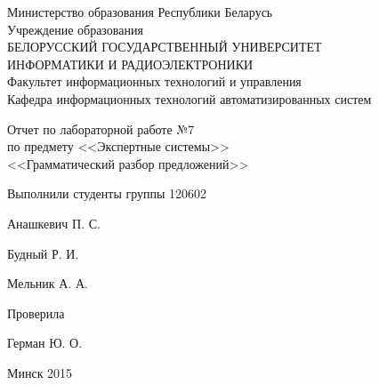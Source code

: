 \thispagestyle{empty}
\setlength{\parindent}{0ex} %

\begin{center}
  Министерство образования Республики Беларусь \\
  \smallskip
  Учреждение образования \\
  БЕЛОРУССКИЙ ГОСУДАРСТВЕННЫЙ УНИВЕРСИТЕТ \\
  ИНФОРМАТИКИ И РАДИОЭЛЕКТРОНИКИ \\
  \smallskip
  Факультет информационных технологий и управления \\
  \smallskip
  Кафедра информационных технологий автоматизированных систем
\end{center}

\vspace{40mm}

\begin{center}
  Отчет по лабораторной работе №7 \\
  по предмету <<Экспертные системы>> \\
  <<Грамматический разбор предложений>> 
\end{center}

\vspace{45mm}

\begin{minipage}{.55\linewidth}
    Выполнили студенты группы 120602
    \vspace{12mm}
\end{minipage}
\hfill
\begin{minipage}{.4\linewidth}
  \begin{flushright}
    Анашкевич П. С.

    Будный Р. И.

    Мельник А. А.
  \end{flushright}
\end{minipage}

\vspace{10mm}

\begin{minipage}{.55\linewidth}
    Проверила
\end{minipage}
\hfill
\begin{minipage}{.4\linewidth}
  \begin{flushright}
    Герман Ю. О.

  \end{flushright}
\end{minipage}

\vspace{40mm}
\begin{center}
  Минск 2015
\end{center}

\setlength{\parindent}{5ex} %

